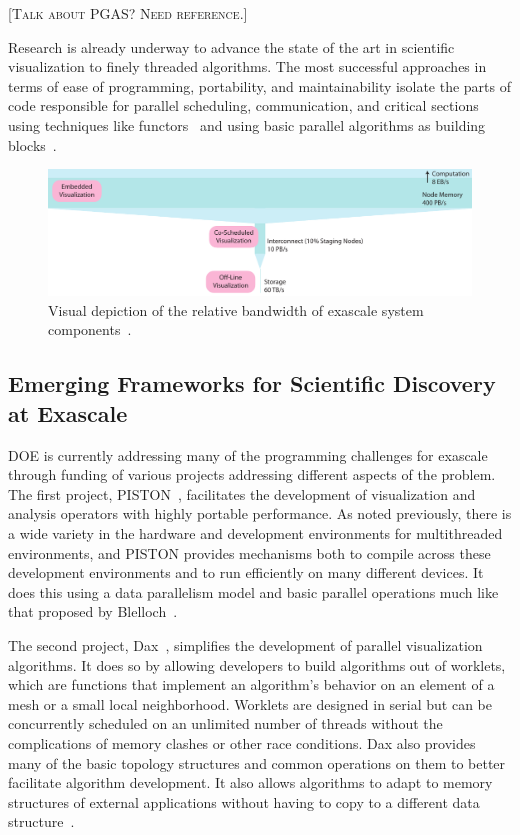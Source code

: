 \documentclass[conference]{IEEEtran}
\newcommand*{\lcite}[1]{~\cite{#1}}
\newcommand*{\scite}[1]{~\cite{#1}}
\newcommand{\fix}[1]{{\color{red}\textsc{[#1]}}}
\begin{document}
\fix{Talk about PGAS?  Need reference.}

Research is already underway to advance the state of the art in scientific
visualization to finely threaded algorithms.  The most successful
approaches in terms of ease of programming, portability, and
maintainability isolate the parts of code responsible for parallel
scheduling, communication, and critical sections using techniques like
functors\lcite{Baker2010} and using basic parallel algorithms as building
blocks\lcite{Blelloch1990}.

\begin{figure}
  \centering
  \includegraphics{images/MinardInSitu}
  \caption{Visual depiction of the relative bandwidth of exascale system
    components\lcite{ScientificDiscoveryExascale2011}.}
  \label{fig:IOBandwidths}
\end{figure}

\subsection{Emerging Frameworks for Scientific Discovery at Exascale}

\noindent
DOE is currently addressing many of the programming challenges for exascale
through funding of various projects addressing different aspects of the
problem.  The first project, PISTON\lcite{PISTON}, facilitates the
development of visualization and analysis operators with highly portable
performance.  As noted previously, there is a wide variety in the hardware
and development environments for multithreaded environments, and PISTON
provides mechanisms both to compile across these development environments
and to run efficiently on many different devices.  It does this using a
data parallelism model and basic parallel operations much like that
proposed by Blelloch\scite{Blelloch1990}.

The second project, Dax\lcite{Moreland2011:LDAV}, simplifies the
development of parallel visualization algorithms.  It does so by allowing
developers to build algorithms out of worklets, which are functions that
implement an algorithm's behavior on an element of a mesh or a small local
neighborhood.  Worklets are designed in serial but can be concurrently
scheduled on an unlimited number of threads without the complications of
memory clashes or other race conditions.  Dax also provides many of the
basic topology structures and common operations on them to better
facilitate algorithm development.  It also allows algorithms to adapt to
memory structures of external applications without having to copy to a
different data structure\lcite{Moreland2012:PDAC}.
\end{document}
